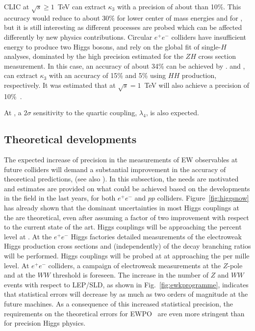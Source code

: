 \documentclass[../report.tex]{subfiles}
\newcommand{\ew}{electroweak\xspace}
\begin{document}
CLIC at $\sqrt s \geq 1$~TeV can extract $\kappa_3$ with a precision of about than 10\%. This accuracy would reduce to about 30\% for lower center of mass energies and for \ILC, but it is still interesting as different processes are probed which can be affected differently by new physics contributions. 
Circular $e^+e^-$ colliders have insufficient energy to produce two Higgs bosons, and rely on the global fit of single-$H$ analyses, dominated by the high precision estimated for the $ZH$ cross section measurement. In this case, an accuracy of about 34\% can be achieved by \FCCee.
\HELHC and \FCChh, can extract $\kappa_3$ with an accuracy of 15\% and 5\% using $HH$ production, respectively. It was estimated that \ILC at $\sqrt{s}=1$~TeV will also achieve a precision of 10\%~\cite{ilc1000}.

At \FCChh, a $2\sigma$ sensitivity to the quartic coupling, $\lambda_4$, is also expected. 

\subsection{Theoretical developments}
\label{sec:ewktheory}
The expected increase of precision in the measurements of EW observables at future colliders will demand a substantial improvement in the accuracy of theoretical predictions, (see also \cite{Blondel:2019qlh}). In this subsection, the needs are motivated and estimates are provided on what could be achieved based on the developments in the field in the last years, for both $e^+ e^-$ and $pp$ colliders. Figure~\ref{fig:higgsnow} has already shown that the dominant uncertainties in most Higgs couplings at the \HLLHC 
are theoretical, even after assuming a factor of two improvement 
with respect to the current state of the art. Higgs couplings will be approaching the percent level at \HLLHC.
At the $e^+e^-$ Higgs factories detailed measurements of the \ew Higgs production cross sections and (independently) of the decay branching ratios will be performed. Higgs couplings will be probed at at approaching the per mille level.
At $e^+e^-$ colliders, a campaign of \ew  measurements at the $Z$-pole and at the $WW$ threshold is foreseen.  
The increase  in the number of $Z$ and $WW$ events with respect to LEP/SLD, as shown in Fig.~\ref{fig:ewkprogramme}, indicates that statistical errors will decrease by as much as two orders of magnitude at the future machines. As a consequence of this increased statistical precision, the requirements on the theoretical errors for EWPO~\cite{Blondel:2018mad} are even more stringent than for precision Higgs physics.
\end{document}
